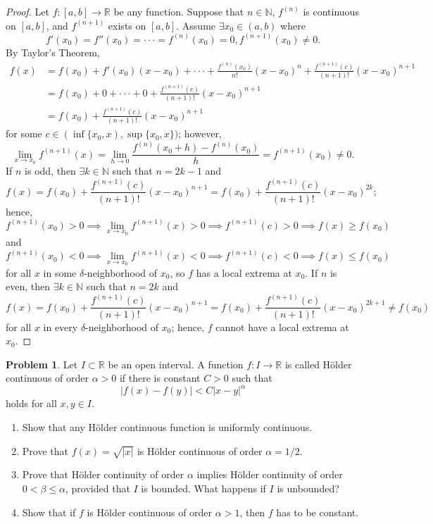 \documentclass{amsart}
\theoremstyle{definition}
\newtheorem{problem}{Problem}
\begin{document}
\begin{proof}
    Let $f: [a,b] \to \mathbb{R}$ be any function. Suppose that $n \in \mathbb{N}$, $f^{(n)}$ is continuous on $[a,b]$, and $f^{(n+1)}$ exists on $[a,b]$. Assume $\exists x_0 \in (a,b)$ where
    \[
    f'(x_0) = f''(x_0) = \cdot \cdot \cdot = f^{(n)}(x_0) = 0, f^{(n+1)}(x_0) \neq 0.
    \]
    By Taylor's Theorem, 
    \begin{align*}
        f(x) &= f(x_0) + f'(x_0)(x-x_0) + \cdot \cdot \cdot + \frac{f^{(n)}(x_0)}{n!}(x-x_0)^n + \frac{f^{(n+1)}(c)}{(n+1)!}(x-x_0)^{n+1} \\
        &= f(x_0) + 0 + \cdot \cdot \cdot + 0 + \frac{f^{(n+1)}(c)}{(n+1)!}(x-x_0)^{n+1} \\
        &= f(x_0) + \frac{f^{(n+1)}(c)}{(n+1)!}(x-x_0)^{n+1}
    \end{align*}
    for some $c \in (\inf\{x_0,x),\sup\{x_0,x\})$; however, 
    \[
    \lim_{x \to x_0}f^{(n+1)}(x) = \lim_{h \to 0}\frac{f^{(n)}(x_0+h)-f^{(n)}(x_0)}{h} = f^{(n+1)}(x_0) \neq 0.
    \]
    If $n$ is odd, then $\exists k \in \mathbb{N}$ such that $n = 2k-1$ and 
    \[
    f(x) = f(x_0) + \frac{f^{(n+1)}(c)}{(n+1)!}(x-x_0)^{n+1} = f(x_0) + \frac{f^{(n+1)}(c)}{(n+1)!}(x-x_0)^{2k};
    \]
    hence,
    \[
    f^{(n+1)}(x_0) > 0 \implies \lim_{x \to x_0}f^{(n+1)}(x) > 0 \implies f^{(n+1)}(c) > 0 \implies f(x) \geq f(x_0)
    \]
    and 
    \[
    f^{(n+1)}(x_0) < 0 \implies \lim_{x \to x_0}f^{(n+1)}(x) < 0 \implies f^{(n+1)}(c) < 0 \implies f(x) \leq f(x_0)
    \]
    for all $x$ in some $\delta$-neighborhood of $x_0$, so $f$ has a local extrema at $x_0$. If $n$ is even, then $\exists k \in \mathbb{N}$ such that $n = 2k$ and 
    \[
    f(x) = f(x_0) + \frac{f^{(n+1)}(c)}{(n+1)!}(x-x_0)^{n+1} = f(x_0) + \frac{f^{(n+1)}(c)}{(n+1)!}(x-x_0)^{2k+1} \neq f(x_0)
    \]
    for all $x$ in every $\delta$-neighborhood of $x_0$; hence, $f$ cannot have a local extrema at $x_0$.
\end{proof}

\begin{problem}
    Let $I \subset \mathbb{R}$ be an open interval. A function $f : I \to \mathbb{R}$ is called H\"{o}lder continuous of order $\alpha > 0$ if there is constant $C > 0$ such that
    \[
    \vert f(x) - f(y) \vert < C\vert x - y \vert^{\alpha}
    \]
    holds for all $x,y \in I$.
    \begin{enumerate}[label = (\alph*)]
        \item Show that any H\"{o}lder continuous function is uniformly continuous.
        \item Prove that $f(x) = \sqrt{\vert x \vert}$ is H\"{o}lder continuous of order $\alpha = 1/2$.    
        \item Prove that H\"{o}lder continuity of order $\alpha$ implies H\"{o}lder continuity of order $0 < \beta \leq \alpha$, provided that $I$ is bounded. What happens if $I$ is unbounded?
        \item Show that if $f$ is H\"{o}lder continuous of order $\alpha > 1$, then $f$ has to be constant.
    \end{enumerate}
\end{problem}
\end{document}
